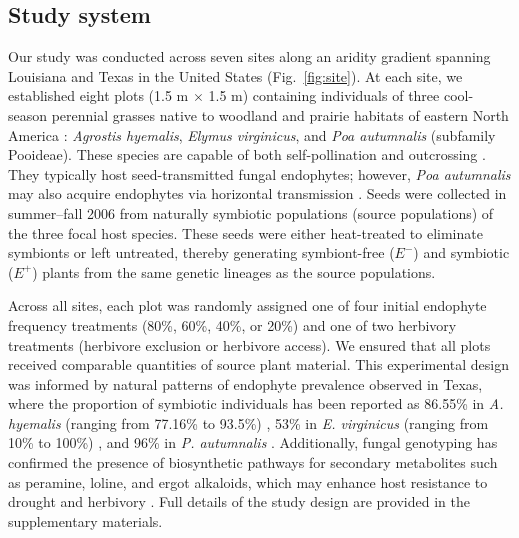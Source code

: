 \documentclass[12pt]{article}\usepackage[]{graphicx}\usepackage[dvipsnames]{xcolor}
\begin{document}
\subsection*{Study system}
Our study was conducted across seven sites along an aridity gradient spanning Louisiana and Texas in the United States (Fig.~\ref{fig:site}).  
At each site, we established eight plots (1.5 m $\times$ 1.5 m) containing individuals of three cool-season perennial grasses native to woodland and prairie habitats of eastern North America \citep{shaw2011guide}: \emph{Agrostis hyemalis}, \emph{Elymus virginicus}, and \emph{Poa autumnalis} (subfamily Pooideae).  
These species are capable of both self-pollination and outcrossing \citep{church1958artificial}.  
They typically host seed-transmitted fungal endophytes; however, \emph{Poa autumnalis} may also acquire endophytes via horizontal transmission \citep{gundel2020simulated}.
Seeds were collected in summer–fall 2006 from naturally symbiotic populations (source populations) of the three focal host species. These seeds were either heat-treated to eliminate symbionts or left untreated, thereby generating symbiont-free ($E^-$) and symbiotic ($E^+$) plants from the same genetic lineages as the source populations.

Across all sites, each plot was randomly assigned one of four initial endophyte frequency treatments (80\%, 60\%, 40\%, or 20\%) and one of two herbivory treatments (herbivore exclusion or herbivore access).  
We ensured that all plots received comparable quantities of source plant material.
This experimental design was informed by natural patterns of endophyte prevalence observed in Texas, where the proportion of symbiotic individuals has been reported as 86.55\% in \emph{A. hyemalis} (ranging from 77.16\% to 93.5\%) \citep{donald2021context}, 53\% in \emph{E. virginicus} (ranging from 10\% to 100\%) \citep{sneck2017variation}, and 96\% in \emph{P. autumnalis} \citep{rudgers2009fungus}.  
Additionally, fungal genotyping has confirmed the presence of biosynthetic pathways for secondary metabolites such as peramine, loline, and ergot alkaloids, which may enhance host resistance to drought and herbivory \citep{beaudry1951seed}.
Full details of the study design are provided in the supplementary materials.
\end{document}
